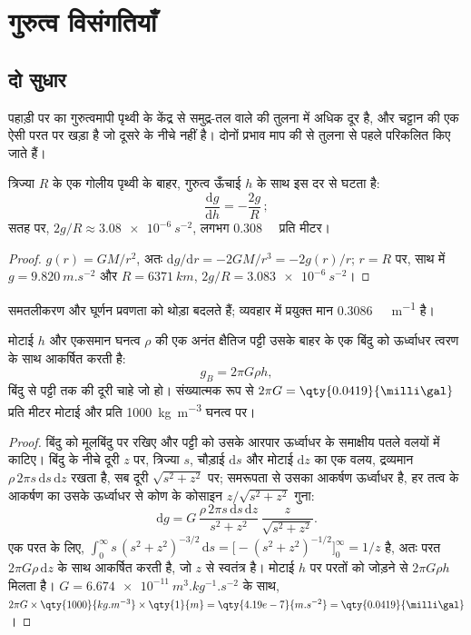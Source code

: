 \section{गुरुत्व विसंगतियाँ}

\subsection*{दो सुधार}

पहाड़ी पर का गुरुत्वमापी पृथ्वी के केंद्र से समुद्र-तल वाले की तुलना में अधिक दूर है, और चट्टान की एक ऐसी परत पर खड़ा है जो दूसरे के नीचे नहीं है। दोनों प्रभाव माप की  से तुलना से पहले परिकलित किए जाते हैं।

\begin{proposition}[मुक्त-वायु प्रवणता]\label{prop:b1:isostasy-gravity:free-air}
त्रिज्या $R$ के एक गोलीय पृथ्वी के बाहर, गुरुत्व ऊँचाई $h$ के साथ इस दर से घटता है:
\[
  \frac{\mathrm dg}{\mathrm dh} = -\frac{2g}{R}\,;
\]
सतह पर, $2g/R \approx \qty{3.08e-6}{s^{-2}}$, लगभग \qty{0.308}{\milli\gal} प्रति मीटर।
\end{proposition}

\begin{proof}
$g(r) = GM/r^2$, अतः $\mathrm dg/\mathrm dr = -2GM/r^3 = -2g(r)/r$; $r = R$ पर, साथ में $g = \qty{9.820}{m.s^{-2}}$ और $R = \qty{6371}{km}$, $2g/R =
\qty{3.083e-6}{s^{-2}}$।
\end{proof}

समतलीकरण और घूर्णन प्रवणता को थोड़ा बदलते हैं; व्यवहार में प्रयुक्त मान \qty{0.3086}{\milli\gal.m^{-1}} है।

\begin{proposition}[बूगेर पट्टी]\label{prop:b1:isostasy-gravity:slab}
मोटाई $h$ और एकसमान घनत्व $\rho$ की एक अनंत क्षैतिज पट्टी उसके बाहर के एक बिंदु को ऊर्ध्वाधर त्वरण के साथ आकर्षित करती है:
\[
  g_B = 2\pi G\rho h ,
\]
बिंदु से पट्टी तक की दूरी चाहे जो हो। संख्यात्मक रूप से $2\pi G =
\qty{0.0419}{\milli\gal}$ प्रति मीटर मोटाई और प्रति \qty{1000}{kg.m^{-3}} घनत्व पर।
\end{proposition}

\begin{proof}
बिंदु को मूलबिंदु पर रखिए और पट्टी को उसके आरपार ऊर्ध्वाधर के समाक्षीय पतले वलयों में काटिए। बिंदु के नीचे दूरी $z$ पर, त्रिज्या $s$, चौड़ाई $\mathrm ds$ और मोटाई $\mathrm dz$ का एक वलय, द्रव्यमान $\rho\,2\pi s\,\mathrm ds\,\mathrm dz$ रखता है, सब दूरी $\sqrt{s^2 + z^2}$ पर; समरूपता से उसका आकर्षण ऊर्ध्वाधर है, हर तत्व के आकर्षण का उसके ऊर्ध्वाधर से कोण के कोसाइन $z/\sqrt{s^2+z^2}$ गुना:
\[
  \mathrm dg = G\,\frac{\rho\,2\pi s\,\mathrm ds\,\mathrm dz}{s^2 + z^2}\,
  \frac{z}{\sqrt{s^2 + z^2}} .
\]
एक परत के लिए, $\int_0^\infty s\,(s^2 + z^2)^{-3/2}\,\mathrm ds =
\bigl[-(s^2 + z^2)^{-1/2}\bigr]_0^\infty = 1/z$ है, अतः परत $2\pi G\rho\,\mathrm dz$ के साथ आकर्षित करती है, जो $z$ से स्वतंत्र है। मोटाई $h$ पर परतों को जोड़ने से $2\pi G\rho h$ मिलता है। $G = \qty{6.674e-11}{m^3.kg^{-1}.s^{-2}}$ के साथ, $2\pi G\times\qty{1000}{kg.m^{-3}}\times\qty{1}{m} = \qty{4.19e-7}{m.s^{-2}} =
\qty{0.0419}{\milli\gal}$।
\end{proof}

